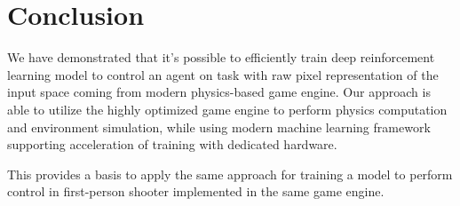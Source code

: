 \section{Conclusion}

We have demonstrated that it's possible to efficiently train deep reinforcement learning model to control an agent on task with raw pixel representation of the input space coming from modern physics-based game engine.
Our approach is able to utilize the highly optimized game engine to perform physics computation and environment simulation, while using modern machine learning framework supporting acceleration of training with dedicated hardware. 

This provides a basis to apply the same approach for training a model to perform control in first-person shooter implemented in the same game engine.